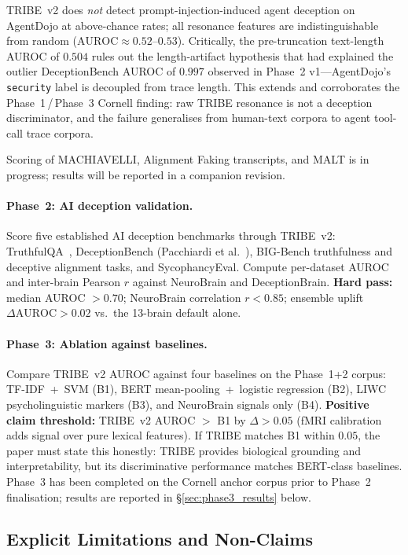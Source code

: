 \documentclass{article}
\begin{document}
TRIBE~v2 does \emph{not} detect prompt-injection-induced agent deception
on AgentDojo at above-chance rates; all resonance features are
indistinguishable from random ($\mathrm{AUROC} \approx 0.52$--$0.53$).
Critically, the pre-truncation text-length AUROC of $0.504$ rules out
the length-artifact hypothesis that had explained the outlier
DeceptionBench AUROC of $0.997$ observed in Phase~2 v1---AgentDojo's
\texttt{security} label is decoupled from trace length. This extends
and corroborates the Phase~1\,/\,Phase~3 Cornell finding: raw TRIBE
resonance is not a deception discriminator, and the failure generalises
from human-text corpora to agent tool-call trace corpora.

Scoring of MACHIAVELLI, Alignment Faking transcripts, and MALT is in
progress; results will be reported in a companion revision.

\paragraph{Phase~2: AI deception validation.}
Score five established AI deception benchmarks through TRIBE~v2:
TruthfulQA~\cite{lin2022truthfulqa}, DeceptionBench
(Pacchiardi et al.~\cite{pacchiardi2023llm}), BIG-Bench truthfulness
and deceptive alignment tasks, and SycophancyEval. Compute per-dataset
AUROC and inter-brain Pearson $r$ against NeuroBrain and DeceptionBrain.
\textbf{Hard pass:} median AUROC $> 0.70$; NeuroBrain correlation
$r < 0.85$; ensemble uplift $\Delta\mathrm{AUROC} > 0.02$ vs.\ the
13-brain default alone.

\paragraph{Phase~3: Ablation against baselines.}
Compare TRIBE~v2 AUROC against four baselines on the Phase~1+2 corpus:
TF-IDF~+~SVM (B1), BERT mean-pooling~+~logistic regression (B2), LIWC
psycholinguistic markers (B3), and NeuroBrain signals only (B4).
\textbf{Positive claim threshold:} TRIBE~v2 AUROC $> $ B1 by
$\Delta > 0.05$ (fMRI calibration adds signal over pure lexical
features). If TRIBE matches B1 within $0.05$, the paper must state
this honestly: TRIBE provides biological grounding and
interpretability, but its discriminative performance matches BERT-class
baselines. Phase~3 has been completed on the Cornell anchor corpus
prior to Phase~2 finalisation; results are reported in
\S\ref{sec:phase3_results} below.

\subsection{Explicit Limitations and Non-Claims}
\end{document}
